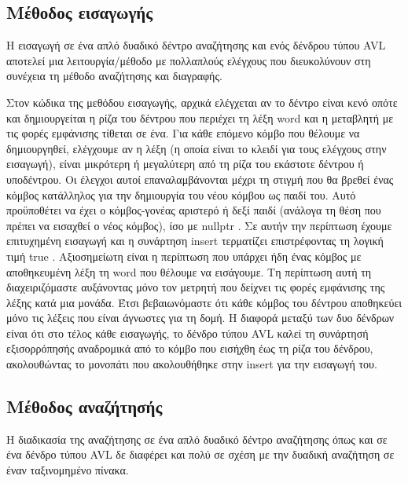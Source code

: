 \subsection{Μέθοδος εισαγωγής}

Η εισαγωγή σε ένα απλό δυαδικό δέντρο αναζήτησης και ενός δένδρου τύπου \en AVL \gr αποτελεί μια λειτουργία/μέθοδο με πολλαπλούς ελέγχους που διευκολύνουν στη συνέχεια τη μέθοδο αναζήτησης και διαγραφής.

Στον κώδικα της μεθόδου εισαγωγής, αρχικά ελέγχεται αν το δέντρο είναι κενό οπότε και δημιουργείται η ρίζα του δέντρου που περιέχει τη λέξη \en word \gr και η μεταβλητή με τις φορές εμφάνισης τίθεται σε ένα. Για κάθε επόμενο κόμβο που θέλουμε να δημιουργηθεί, ελέγχουμε αν η λέξη (η οποία είναι το κλειδί για τους ελέγχους στην εισαγωγή), είναι μικρότερη ή μεγαλύτερη από τη ρίζα του εκάστοτε δέντρου ή υποδέντρου. Οι έλεγχοι αυτοί επαναλαμβάνονται μέχρι τη στιγμή που θα βρεθεί ένας κόμβος κατάλληλος για την δημιουργία του νέου κόμβου ως παιδί του. Αυτό προϋποθέτει να έχει ο κόμβος-γονέας αριστερό ή δεξί παιδί (ανάλογα τη θέση που πρέπει να εισαχθεί ο νέος κόμβος), ίσο με \en nullptr \gr. Σε αυτήν την περίπτωση έχουμε επιτυχημένη εισαγωγή και η συνάρτηση \en insert \gr τερματίζει επιστρέφοντας τη λογική τιμή \en true \gr. Αξιοσημείωτη είναι η περίπτωση που υπάρχει ήδη ένας κόμβος με αποθηκευμένη λέξη τη \en word \gr που θέλουμε να εισάγουμε. Τη περίπτωση αυτή τη διαχειριζόμαστε αυξάνοντας μόνο τον μετρητή που δείχνει τις φορές εμφάνισης της λέξης κατά μια μονάδα. Έτσι βεβαιωνόμαστε ότι κάθε κόμβος του δέντρου αποθηκεύει μόνο τις λέξεις που είναι άγνωστες για τη δομή. Η διαφορά μεταξύ των δυο δένδρων είναι ότι στο τέλος κάθε εισαγωγής, το δένδρο τύπου \en AVL \gr καλεί τη συνάρτησή εξισορρόπησής αναδρομικά από το κόμβο που εισήχθη έως τη ρίζα του δένδρου, ακολουθώντας το μονοπάτι που ακολουθήθηκε στην \en insert \gr για την εισαγωγή του.  

\subsection{Μέθοδος αναζήτησής}

Η διαδικασία της αναζήτησης σε ένα απλό δυαδικό δέντρο αναζήτησης όπως και σε ένα δένδρο τύπου \en AVL \gr δε διαφέρει και πολύ σε σχέση με την δυαδική αναζήτηση σε έναν ταξινομημένο πίνακα.

